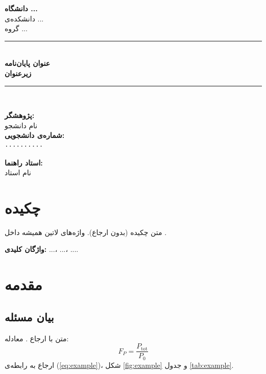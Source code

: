 \documentclass[12pt,a4paper]{report}
\newcommand{\sub}[1]{\mathrm{#1}}               %
\begin{document}
\begin{titlepage}
\begin{center}
\vspace*{1.5cm}
{\Large\textbf{دانشگاه ...}}\\[6pt]
{\large دانشکده‌ی ...}\\[4pt]
{\large گروه ...}\\[2.2cm]
\rule{\textwidth}{0.6pt}\\[10pt]
{\LARGE\textbf{عنوان پایان‌نامه}}\\[14pt]
{\large\textbf{زیرعنوان}}\\[10pt]
\rule{\textwidth}{0.6pt}\\[2.5cm]
\begin{minipage}[t]{0.48\textwidth}
\textbf{پژوهشگر:}\\ نام دانشجو\\[12pt]
\textbf{شماره‌ی دانشجویی:}\\ ۰۰۰۰۰۰۰۰۰۰
\end{minipage}\hfill
\begin{minipage}[t]{0.42\textwidth}
\textbf{استاد راهنما:}\\ نام استاد
\end{minipage}
\end{center}
\end{titlepage}

\chapter*{چکیده}
متن چکیده (بدون ارجاع). واژه‌های لاتین همیشه داخل .

\vspace{6pt}
\noindent\textbf{واژگان کلیدی:} ...، ...، ....

\tableofcontents

\chapter{مقدمه}
\section{بیان مسئله}
متن با ارجاع \cite{key1}. معادله:
\begin{equation}\label{eq:example}
F_P=\frac{P_{\sub{tot}}}{P_0}
\end{equation}
ارجاع به رابطه‌ی (\ref{eq:example})، شکل \ref{fig:example} و جدول \ref{tab:example}.
\end{document}
